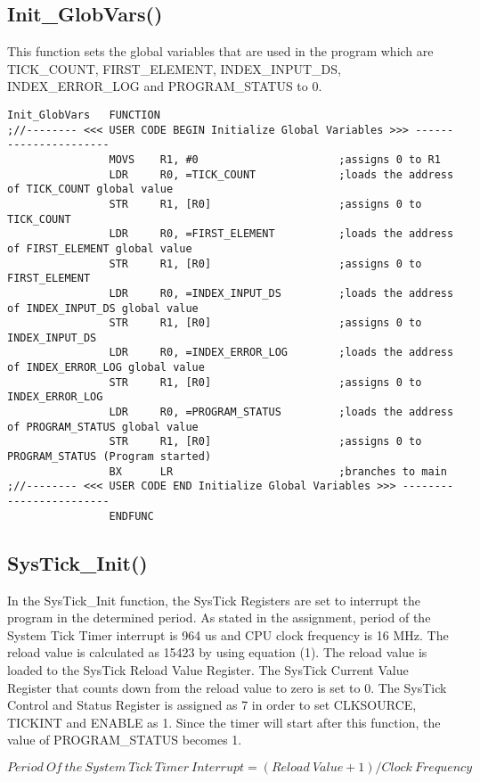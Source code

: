 \documentclass[pdftex,12pt,a4paper]{article}
\begin{document}
\newpage

\subsection{Init\_GlobVars()}
\par This function sets the global variables that are used in the program which are TICK\_COUNT, FIRST\_ELEMENT, INDEX\_INPUT\_DS, INDEX\_ERROR\_LOG and PROGRAM\_STATUS to 0. 
\begin{lstlisting}[caption=Init\_GlobVars, style=customasm]
Init_GlobVars	FUNCTION			
;//-------- <<< USER CODE BEGIN Initialize Global Variables >>> ----------------------		
				MOVS	R1, #0						;assigns 0 to R1
				LDR 	R0, =TICK_COUNT				;loads the address of TICK_COUNT global value
				STR		R1, [R0]					;assigns 0 to TICK_COUNT
				LDR 	R0, =FIRST_ELEMENT			;loads the address of FIRST_ELEMENT global value
				STR		R1, [R0]					;assigns 0 to FIRST_ELEMENT
				LDR 	R0, =INDEX_INPUT_DS			;loads the address of INDEX_INPUT_DS global value
				STR		R1, [R0]					;assigns 0 to INDEX_INPUT_DS
				LDR 	R0, =INDEX_ERROR_LOG		;loads the address of INDEX_ERROR_LOG global value
				STR		R1, [R0]					;assigns 0 to INDEX_ERROR_LOG
				LDR 	R0, =PROGRAM_STATUS			;loads the address of PROGRAM_STATUS global value
				STR		R1, [R0]					;assigns 0 to PROGRAM_STATUS (Program started)
				BX		LR							;branches to main			
;//-------- <<< USER CODE END Initialize Global Variables >>> ------------------------				
				ENDFUNC
\end{lstlisting}

\subsection{SysTick\_Init()}

In the SysTick\_Init function, the SysTick Registers are set to interrupt the program in the determined period. As stated in the assignment, period of the System Tick Timer interrupt is 964 us and CPU clock frequency is 16 MHz. The reload value is calculated as 15423 by using equation (1). The reload value is loaded to the SysTick Reload Value Register. The SysTick Current Value Register that counts down from the reload value to zero is set to 0. The SysTick Control and Status Register is assigned as 7 in order to set CLKSOURCE, TICKINT and ENABLE as 1. Since the timer will start after this function, the value of PROGRAM\_STATUS becomes 1. 

\begin{equation}
    Period~Of~the~System~Tick~Timer~Interrupt = (Reload~Value + 1)/Clock~Frequency
\end{equation}
\end{document}
